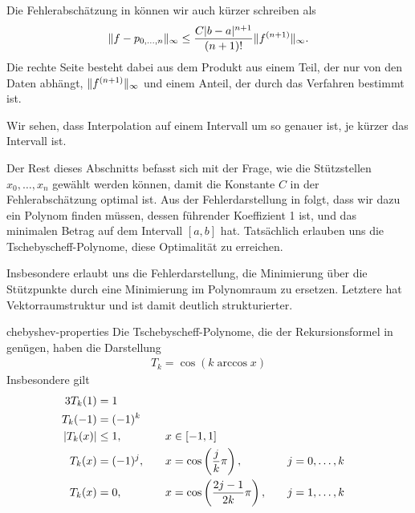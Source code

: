 \begin{remark}
  Die Fehlerabschätzung in 
  können wir auch kürzer schreiben als
  \begin{gather}
    \lVert f-p_{0,\dots,n}\rVert_\infty \le \frac{C \lvert b-a\rvert^{n+1}}{(n+1)!}
    \lVert f^{(n+1)}\rVert_{\infty}.
  \end{gather}
  Die rechte Seite besteht dabei aus dem Produkt aus einem Teil, der
  nur von den Daten abhängt, $\lVert f^{(n+1)}\rVert_{\infty}$ und einem
  Anteil, der durch das Verfahren bestimmt ist.

  Wir sehen, dass Interpolation auf einem Intervall um so genauer ist,
  je kürzer das Intervall ist.
\end{remark}

\begin{intro}
  Der Rest dieses Abschnitts befasst sich mit der Frage, wie die
  Stützstellen $x_0,\dots,x_n$ gewählt werden können, damit die
  Konstante $C$ in der Fehlerabschätzung optimal ist.  Aus der
  Fehlerdarstellung in  folgt, dass
  wir dazu ein Polynom finden müssen, dessen führender Koeffizient 1
  ist, und das minimalen Betrag auf dem Intervall $[a,b]$ hat.
  Tatsächlich erlauben uns die Tschebyscheff-Polynome, diese
  Optimalität zu erreichen.

  Insbesondere erlaubt uns die Fehlerdarstellung, die Minimierung über
  die Stützpunkte durch eine Minimierung im Polynomraum zu
  ersetzen. Letztere hat Vektorraumstruktur und ist damit deutlich
  strukturierter.
\end{intro}

\begin{Lemma}{chebyshev-properties}
  Die Tschebyscheff-Polynome, die der Rekursionsformel in
   genügen, haben die
  Darstellung
  \begin{gather}
    T_k = \cos(k \operatorname{arccos} x)
  \end{gather}
  Insbesondere gilt
  \begin{alignat}3
    T_k(1)&=1\\
    T_k(-1) &= (-1)^k\\
    \abs{T_k(x)} &\le 1, &\quad x&\in [-1,1]\\
    T_k(x) &=(-1)^j,
                   &\quad x&=\cos\left(\frac{j}{k}\pi\right),
                   &\quad j&=0,\dots,k\\
    T_k(x) &= 0,
             &\quad x&=\cos\left(\frac{2j-1}{2k}\pi\right),
             &\quad j&=1,\dots,k
  \end{alignat}
\end{Lemma}

